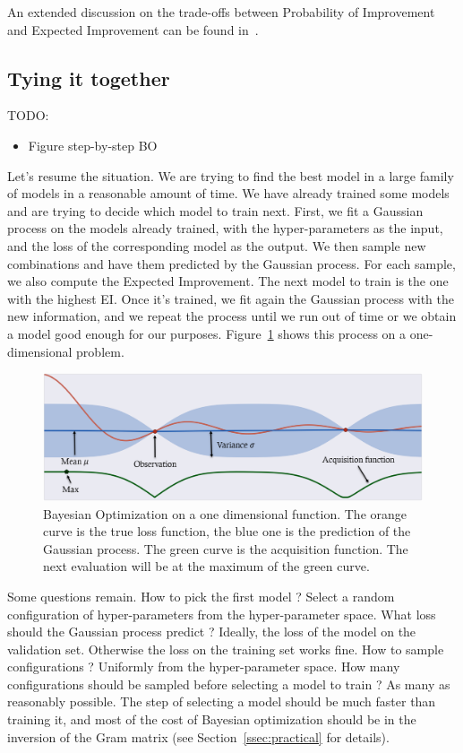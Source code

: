 An extended discussion on the trade-offs between Probability of Improvement and Expected Improvement can be found in~\textcite{jones2001}.

\subsection{Tying it together}

TODO:
\begin{itemize}
    \item Figure step-by-step BO
\end{itemize}

Let's resume the situation. We are trying to find the best model in a large family of models in a reasonable amount of time. We have already trained some models and are trying to decide which model to train next. First, we fit a Gaussian process on the models already trained, with the hyper-parameters as the input, and the loss of the corresponding model as the output. We then sample new combinations and have them predicted by the Gaussian process. For each sample, we also compute the Expected Improvement. The next model to train is the one with the highest EI. Once it's trained, we fit again the Gaussian process with the new information, and we repeat the process until we run out of time or we obtain a model good enough for our purposes. Figure~\ref{fig:bo} shows this process on a one-dimensional problem.

\begin{figure}[htb]
	\centering
	\includegraphics[width=\linewidth]{img_hyperopt/bo.png}
	\caption{Bayesian Optimization on a one dimensional function. The orange curve is the true loss function, the blue one is the prediction of the Gaussian process. The green curve is the acquisition function. The next evaluation will be at the maximum of the green curve.}
	\label{fig:bo}
\end{figure}

Some questions remain. How to pick the first model ? Select a random configuration of hyper-parameters from the hyper-parameter space. What loss should the Gaussian process predict ? Ideally, the loss of the model on the validation set. Otherwise the loss on the training set works fine. How to sample configurations ? Uniformly from the hyper-parameter space. How many configurations should be sampled before selecting a model to train ? As many as reasonably possible. The step of selecting a model should be much faster than training it, and most of the cost of Bayesian optimization should be in the inversion of the Gram matrix (see Section~\ref{ssec:practical} for details).


